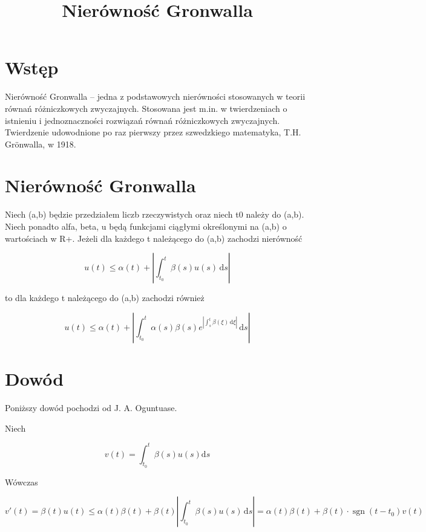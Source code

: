 \documentclass{article}
\begin{document}
\title{Nierówność Gronwalla}
\maketitle

\section*{Wstęp}
Nierówność Gronwalla – jedna z podstawowych nierówności stosowanych w teorii równań różniczkowych zwyczajnych. Stosowana jest m.in. w twierdzeniach o istnieniu i jednoznaczności rozwiązań równań różniczkowych zwyczajnych. Twierdzenie udowodnione po raz pierwszy przez szwedzkiego matematyka, T.H. Grönwalla, w 1918. 

\section*{Nierówność Gronwalla}

Niech (a,b) będzie przedziałem liczb rzeczywistych oraz niech t0 należy do (a,b). Niech ponadto alfa, beta, u będą funkcjami ciągłymi określonymi na (a,b) o wartościach w R+. Jeżeli dla każdego t należącego do (a,b) zachodzi nierówność

\begin{displaymath}
	u(t)\leq \alpha (t)+\left|\int _{t_{0}}^{t}\beta (s)u(s)\,\mathrm {d} s\right|
\end{displaymath}

to dla każdego t należącego do (a,b) zachodzi również

\begin{equation*}
    u(t)\leq \alpha (t)+\left|\int _{t_{0}}^{t}\alpha (s)\beta (s)e^{\left|\int _{s}^{t}\beta (\xi )\,\mathrm {d} \xi \right|}\,{\mbox{d}}s\right|
\end{equation*}

\section*{Dowód}
Poniższy dowód pochodzi od J. A. Oguntuase.

Niech 

\begin{displaymath}
	v(t)=\int _{t_{0}}^{t}\beta (s)u(s){\mbox{d}}s
\end{displaymath}

Wówczas

\begin{equation*}
	v'(t)=\beta (t)u(t)\leq \alpha (t)\beta (t)+\beta (t)\left|\int _{t_{0}}^{t}\beta (s)u(s)\,{\mbox{d}}s\right|=\alpha (t)\beta (t)+\beta (t)\cdot \operatorname {sgn}(t-t_{0})v(t)
\end{equation*}
\end{document}
